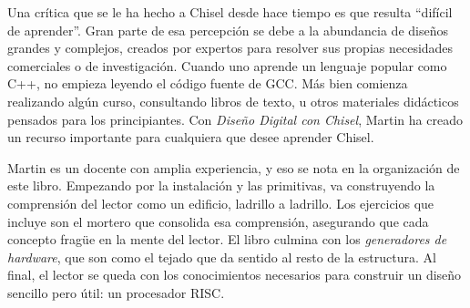 \documentclass[%
    10pt,
    headinclude, footinclude=false,
    openright, %
    notitlepage,
    cleardoublepage=empty,
    headsepline,
    numbers=noenddot,
    bibliography=totoc, index=totoc,
    ]{scrbook}
\begin{document}

Una crítica que se le ha hecho a Chisel desde hace tiempo es que resulta ``difícil de aprender''. 
Gran parte de esa percepción se debe a la abundancia de diseños grandes y complejos, creados por expertos para 
resolver sus propias necesidades comerciales o de investigación. Cuando uno aprende un lenguaje popular como C++, 
no empieza leyendo el código fuente de GCC. Más bien comienza realizando algún curso, consultando libros de texto, 
u otros materiales didácticos pensados para los principiantes. Con \emph{Diseño Digital con Chisel}, Martin ha 
creado un recurso importante para cualquiera que desee aprender Chisel.


Martin es un docente con amplia experiencia, y eso se nota en la organización de este libro. Empezando por la instalación y 
las primitivas, va construyendo la comprensión del lector como un edificio, ladrillo a ladrillo. Los ejercicios que 
incluye son el mortero que consolida esa comprensión, asegurando que cada concepto fragüe en la mente del lector. 
El libro culmina con los \emph{generadores de hardware}, que son como el tejado que da sentido al resto de la 
estructura. Al final, el lector se queda con los conocimientos necesarios para construir un diseño sencillo pero 
útil: un procesador RISC.

\end{document}
